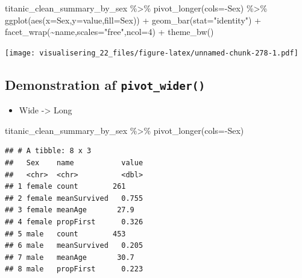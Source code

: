 \documentclass[
]{book}
\newenvironment{Shaded}{\begin{snugshade}}{\end{snugshade}}
\newcommand{\AttributeTok}[1]{\textcolor[rgb]{0.77,0.63,0.00}{#1}}
\newcommand{\DecValTok}[1]{\textcolor[rgb]{0.00,0.00,0.81}{#1}}
\newcommand{\FunctionTok}[1]{\textcolor[rgb]{0.00,0.00,0.00}{#1}}
\newcommand{\NormalTok}[1]{#1}
\newcommand{\SpecialCharTok}[1]{\textcolor[rgb]{0.00,0.00,0.00}{#1}}
\newcommand{\StringTok}[1]{\textcolor[rgb]{0.31,0.60,0.02}{#1}}
\providecommand{\tightlist}{%
  \setlength{\itemsep}{0pt}\setlength{\parskip}{0pt}}
\begin{document}
\begin{Shaded}
\begin{Highlighting}[]
\NormalTok{titanic\_clean\_summary\_by\_sex }\SpecialCharTok{\%\textgreater{}\%} 
  \FunctionTok{pivot\_longer}\NormalTok{(}\AttributeTok{cols=}\SpecialCharTok{{-}}\NormalTok{Sex) }\SpecialCharTok{\%\textgreater{}\%}
  \FunctionTok{ggplot}\NormalTok{(}\FunctionTok{aes}\NormalTok{(}\AttributeTok{x=}\NormalTok{Sex,}\AttributeTok{y=}\NormalTok{value,}\AttributeTok{fill=}\NormalTok{Sex)) }\SpecialCharTok{+} 
  \FunctionTok{geom\_bar}\NormalTok{(}\AttributeTok{stat=}\StringTok{"identity"}\NormalTok{) }\SpecialCharTok{+} 
  \FunctionTok{facet\_wrap}\NormalTok{(}\SpecialCharTok{\textasciitilde{}}\NormalTok{name,}\AttributeTok{scales=}\StringTok{"free"}\NormalTok{,}\AttributeTok{ncol=}\DecValTok{4}\NormalTok{) }\SpecialCharTok{+}  
  \FunctionTok{theme\_bw}\NormalTok{()}
\end{Highlighting}
\end{Shaded}

\texttt{[image: visualisering\_22\_files/figure-latex/unnamed-chunk-278-1.pdf]}

\hypertarget{demonstration-af-pivot_wider}{%
\subsection{\texorpdfstring{Demonstration af \texttt{pivot\_wider()}}{Demonstration af pivot\_wider()}}\label{demonstration-af-pivot_wider}}

\begin{itemize}
\tightlist
\item
  Wide -\textgreater{} Long
\end{itemize}

\begin{Shaded}
\begin{Highlighting}[]
\NormalTok{titanic\_clean\_summary\_by\_sex }\SpecialCharTok{\%\textgreater{}\%} 
  \FunctionTok{pivot\_longer}\NormalTok{(}\AttributeTok{cols=}\SpecialCharTok{{-}}\NormalTok{Sex)}
\end{Highlighting}
\end{Shaded}

\begin{verbatim}
## # A tibble: 8 x 3
##   Sex    name           value
##   <chr>  <chr>          <dbl>
## 1 female count        261    
## 2 female meanSurvived   0.755
## 3 female meanAge       27.9  
## 4 female propFirst      0.326
## 5 male   count        453    
## 6 male   meanSurvived   0.205
## 7 male   meanAge       30.7  
## 8 male   propFirst      0.223
\end{verbatim}
\end{document}

